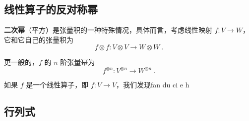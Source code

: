 
\begin{issues}
\issueDraft
{}
\end{issues}


\subsection{线性算子的反对称幂}

\textbf{二次幂}（平方）是张量积的一种特殊情况，具体而言，考虑线性映射 $f: V \to W$，它和它自己的张量积为
\begin{equation}
f \otimes f: V \otimes V \to W \otimes W~.
\end{equation}

更一般的，$f$ 的 $n$ 阶张量幂为
\begin{equation}
f^{\otimes n}: V^{\otimes n} \to W^{\otimes n}~.
\end{equation}

如果 $f$ 是一个线性算子，即 $f: V \to V$，我们发现fan du ci e h $$




\subsection{行列式}

